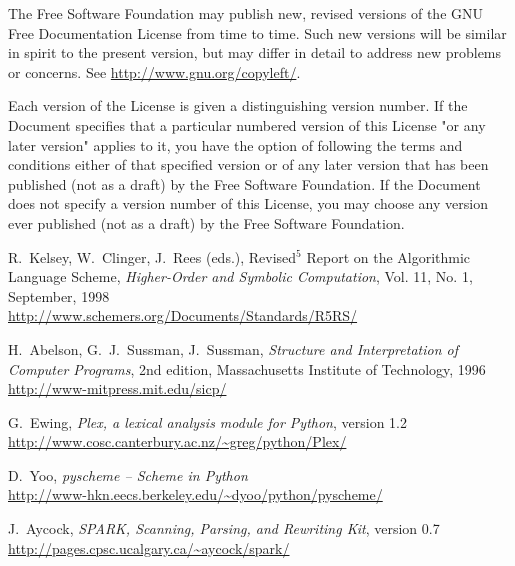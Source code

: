 \documentclass{report}
\begin{document}
The Free Software Foundation may publish new, revised versions
of the GNU Free Documentation License from time to time.  Such new
versions will be similar in spirit to the present version, but may
differ in detail to address new problems or concerns. See
\url{http://www.gnu.org/copyleft/}.

Each version of the License is given a distinguishing version number.
If the Document specifies that a particular numbered version of this
License "or any later version" applies to it, you have the option of
following the terms and conditions either of that specified version or
of any later version that has been published (not as a draft) by the
Free Software Foundation.  If the Document does not specify a version
number of this License, you may choose any version ever published (not
as a draft) by the Free Software Foundation.

\begin{thebibliography}{99}

R.~Kelsey, W.~Clinger, J.~Rees (eds.), Revised{$^5$}
Report on the Algorithmic Language Scheme, \emph{Higher-Order and
Symbolic Computation}, Vol. 11, No. 1, September, 1998 \\
\url{http://www.schemers.org/Documents/Standards/R5RS/}

H.~Abelson, G.~J.~Sussman, J.~Sussman,
\emph{Structure and Interpretation of Computer Programs}, 2nd edition,
Massachusetts Institute of Technology, 1996 \\
\url{http://www-mitpress.mit.edu/sicp/}

G.~Ewing, \emph{Plex, a lexical analysis module
for Python}, version 1.2 \\
\url{http://www.cosc.canterbury.ac.nz/~greg/python/Plex/}

D.~Yoo, \emph{pyscheme -- Scheme in Python} \\
\url{http://www-hkn.eecs.berkeley.edu/~dyoo/python/pyscheme/} 

J.~Aycock, \emph{SPARK, Scanning, Parsing, and
Rewriting Kit}, version 0.7 \\
\url{http://pages.cpsc.ucalgary.ca/~aycock/spark/}

\end{thebibliography}
\end{document}
